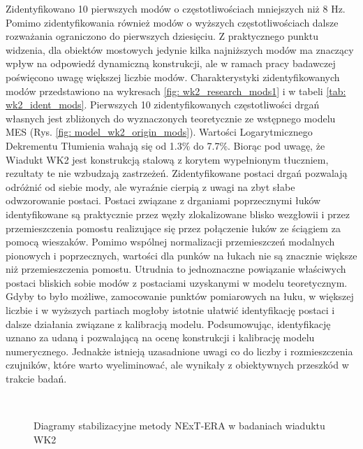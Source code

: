  Zidentyfikowano 10 pierwszych modów o częstotliwościach mniejszych niż 8 Hz. Pomimo zidentyfikowania również modów o wyższych częstotliwościach dalsze rozważania ograniczono do pierwszych dziesięciu. Z praktycznego punktu widzenia, dla obiektów mostowych jedynie kilka najniższych modów ma znaczący wpływ na odpowiedź dynamiczną konstrukcji, ale w ramach pracy badawczej poświęcono uwagę większej liczbie modów. Charakterystyki zidentyfikowanych modów przedstawiono na wykresach \ref{fig: wk2_research_mods1} i w tabeli \ref{tab: wk2_ident_mods}. Pierwszych 10 zidentyfikowanych częstotliwości drgań własnych jest zbliżonych do wyznaczonych teoretycznie ze wstępnego modelu MES (Rys. \ref{fig: model_wk2_origin_mods}). Wartości Logarytmicznego Dekrementu Tłumienia wahają się od 1.3\% do 7.7\%. Biorąc pod uwagę, że Wiadukt WK2 jest konstrukcją stalową z korytem wypełnionym tłuczniem, rezultaty te nie wzbudzają zastrzeżeń. Zidentyfikowane postaci drgań pozwalają odróżnić od siebie mody, ale wyraźnie cierpią z uwagi na zbyt słabe odwzorowanie postaci. Postaci związane z drganiami poprzecznymi łuków identyfikowane są praktycznie przez węzły zlokalizowane blisko wezgłowii i przez przemieszczenia pomostu realizujące się przez połączenie łuków ze ściągiem za pomocą wieszaków. Pomimo wspólnej normalizacji przemieszczeń modalnych pionowych i poprzecznych, wartości dla punków na łukach nie są znacznie większe niż przemieszczenia pomostu. Utrudnia to jednoznaczne powiązanie właściwych postaci bliskich sobie modów z postaciami uzyskanymi w modelu teoretycznym. Gdyby to było możliwe, zamocowanie punktów pomiarowych na łuku, w większej liczbie i w wyższych partiach mogłoby istotnie ułatwić identyfikację postaci i dalsze działania związane z kalibracją modelu. Podsumowując, identyfikację uznano za udaną i pozwalającą na ocenę konstrukcji i kalibrację modelu numerycznego. Jednakże istnieją uzasadnione uwagi co do liczby i rozmieszczenia czujników, które warto wyeliminować, ale wynikały z obiektywnych przeszkód w trakcie badań.

\begin{figure}[hbt!]
	\centering
	\\
	\captionsetup{justification=centering}
	\caption{Diagramy stabilizacyjne metody NExT-ERA w badaniach wiaduktu WK2}
	\label{fig: wk2_research_stabdiags}
\end{figure}

